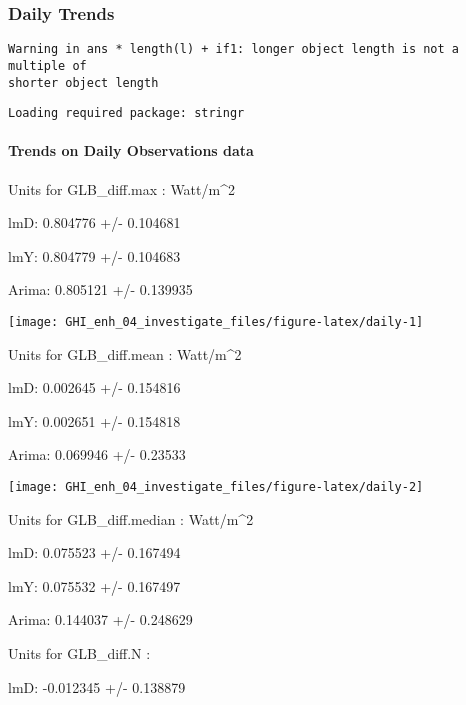 \documentclass[
  10pt,
  a4paper,oneside]{article}
\begin{document}
\newpage
\FloatBarrier

\hypertarget{daily-trends}{%
\subsubsection{Daily Trends}\label{daily-trends}}

\begin{verbatim}
Warning in ans * length(l) + if1: longer object length is not a multiple of
shorter object length
\end{verbatim}

\newpage

\begin{verbatim}
Loading required package: stringr
\end{verbatim}

\hypertarget{trends-on-daily-observations-data}{%
\paragraph{Trends on Daily Observations data}\label{trends-on-daily-observations-data}}

Units for GLB\_diff.max : Watt/m\^{}2

lmD: 0.804776 +/- 0.104681

lmY: 0.804779 +/- 0.104683

Arima: 0.805121 +/- 0.139935

\begin{center}\texttt{[image: GHI\_enh\_04\_investigate\_files/figure-latex/daily-1]} \end{center}

Units for GLB\_diff.mean : Watt/m\^{}2

lmD: 0.002645 +/- 0.154816

lmY: 0.002651 +/- 0.154818

Arima: 0.069946 +/- 0.23533

\begin{center}\texttt{[image: GHI\_enh\_04\_investigate\_files/figure-latex/daily-2]} \end{center}

Units for GLB\_diff.median : Watt/m\^{}2

lmD: 0.075523 +/- 0.167494

lmY: 0.075532 +/- 0.167497

Arima: 0.144037 +/- 0.248629

Units for GLB\_diff.N :

lmD: -0.012345 +/- 0.138879
\end{document}
